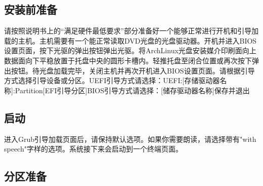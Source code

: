 \documentclass{article}
\newenvironment{singlecolumn}{%
	\par
	\noindent
	\begin{minipage}[t]{\textwidth}
		\setlength{\parfillskip}{0pt plus 1fil}
	}{%
	\end{minipage}
	\par
}
\begin{document}
\begin{singlecolumn}
\begin{tcolorbox}
\section*{安装前准备}
\end{tcolorbox}

请按照说明书上的“满足硬件最低要求”部分准备好一个能够正常进行开机和引导加载的主机。主机需要有一个能正常读取DVD光盘的光盘驱动器。开机并进入BIOS设置页面，按下光驱的弹出按钮弹出光驱。将ArchLinux光盘安装媒介印刷面向上数据面向下平稳放置于托盘中央的圆形卡槽内。轻推托盘至闭合位置或再次按下弹出按钮。待光盘加载完毕，关闭主机并再次开机进入BIOS设置页面。请根据引导方式选择引导设备或分区。\textcolor{uefi}{UEFI引导方式请选择：UEFI:[存储驱动器名称]:Partition[EFI引导分区]}\textcolor{bios}{BIOS引导方式请选择：[储存驱动器名称]保存并退出}

\medskip

\begin{tcolorbox}
	\section*{启动}
\end{tcolorbox}

进入Grub引导加载页面后，请保持默认选项。如果你需要朗读，请选择带有"with speech"字样的选项。系统接下来会启动到一个终端页面。

\medskip

\begin{tcolorbox}
	\section*{分区准备}
\end{tcolorbox}


\end{singlecolumn}
\end{document}
